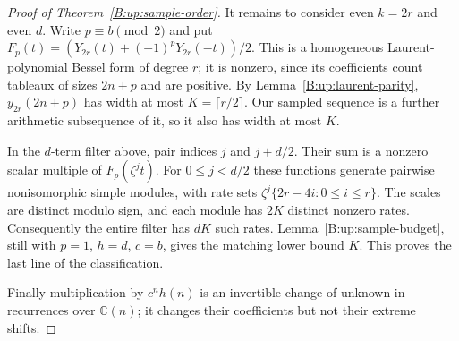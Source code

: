 \documentclass[11pt,a4paper]{article}
\theoremstyle{definition}
\theoremstyle{remark}
\newcommand{\C}{\mathbb C}
\numberwithin{equation}{section}
\begin{document}
\begin{proof}[Proof of Theorem~\ref{B:up:sample-order}]
It remains to consider even $k=2r$ and even $d$.  Write
$p\equiv b\pmod2$ and put
$F_p(t)=(Y_{2r}(t)+(-1)^pY_{2r}(-t))/2$.
This is a homogeneous Laurent-polynomial Bessel form of degree $r$;
it is nonzero, since its coefficients count tableaux of sizes
$2n+p$ and are positive.  By Lemma~\ref{B:up:laurent-parity},
$y_{2r}(2n+p)$ has width at most $K=\lceil r/2\rceil$.
Our sampled sequence is a further arithmetic subsequence of it,
so it also has width at most $K$.

In the $d$-term filter above, pair indices $j$ and $j+d/2$.
Their sum is a nonzero scalar multiple of $F_p(\zeta^jt)$.
For $0\le j<d/2$ these functions generate pairwise nonisomorphic
simple modules, with rate sets
$\zeta^j\{2r-4i:0\le i\le r\}$.  The scales are distinct modulo
sign, and each module has $2K$ distinct nonzero rates.
Consequently the entire filter has $dK$ such rates.
Lemma~\ref{B:up:sample-budget}, still with $p=1$, $h=d$, $c=b$,
gives the matching lower bound $K$.  This proves the last line
of the classification.

Finally multiplication by $c^nh(n)$ is an invertible change of
unknown in recurrences over $\C(n)$; it changes their
coefficients but not their extreme shifts.
\end{proof}
\end{document}
